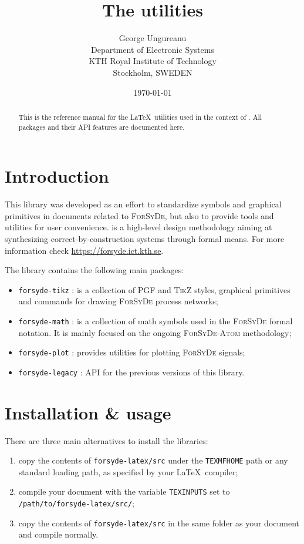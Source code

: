 \documentclass[10pt]{article}
\title{The \ForSyDeLaTeX utilities}
\author{
  George Ungureanu \\
  Department of Electronic Systems\\
  KTH Royal Institute of Technology\\
  Stockholm, SWEDEN
}
\date{\today}
\begin{document}
\maketitle
\reversemarginpar

\begin{abstract}
This is the reference manual for the \LaTeX\ utilities used in the context of \ForSyDe. All packages and their API features are documented here.
\end{abstract}

\section{Introduction}

This library was developed as an effort to standardize symbols and graphical primitives in documents related to \textsc{ForSyDe}, but also to provide tools and utilities for user convenience. \ForSyDe is a high-level design methodology aiming at synthesizing correct-by-construction systems through formal means. For more information check \url{https://forsyde.ict.kth.se}.

The library contains the following main packages:
\begin{itemize}
\item \texttt{forsyde-tikz} : is a collection of \textsc{PGF} and
  \textsc{TikZ} styles, graphical primitives and commands for
  drawing \textsc{ForSyDe} process networks;
\item \texttt{forsyde-math} : is a collection of math symbols used in
  the \textsc{ForSyDe} formal notation. It is mainly focused on the
  ongoing \textsc{ForSyDe-Atom} methodology;
\item \texttt{forsyde-plot} : provides utilities for plotting
  \textsc{ForSyDe} signals;
\item \texttt{forsyde-legacy} : API for the previous versions of this
  library.
\end{itemize}

\section{Installation \& usage}

There are three main alternatives to install the libraries:

\begin{enumerate}
\item copy the contents of \texttt{forsyde-latex/src} under the \texttt{TEXMFHOME} path or any standard loading path, as specified by your \LaTeX\ compiler;
\item compile your document with the variable \texttt{TEXINPUTS} set to \texttt{/path/to/forsyde-latex/src/};
\item copy the contents of \texttt{forsyde-latex/src} in the same folder as your document and compile normally.
\end{enumerate}
\end{document}
